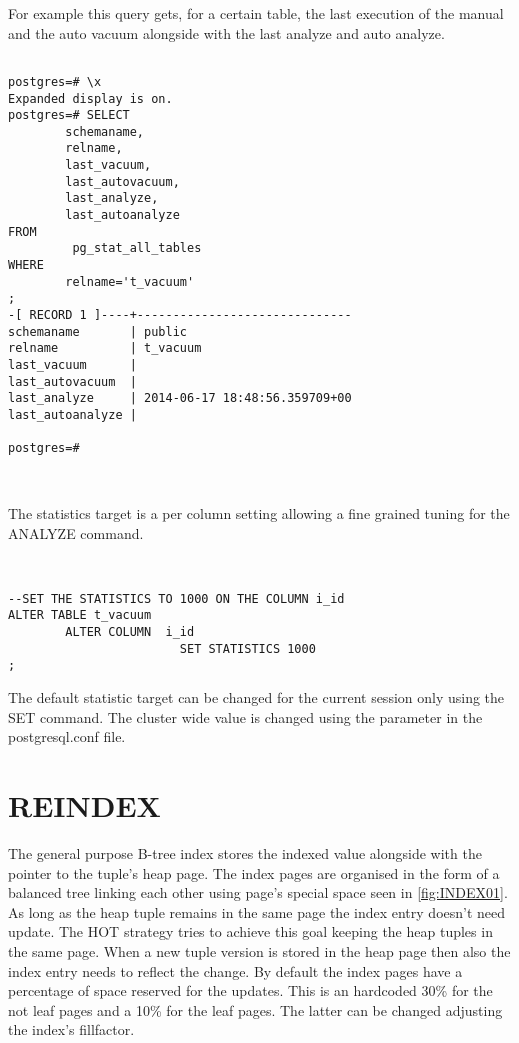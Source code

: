 For example this query gets, for a certain table,  the last execution of the manual and the auto vacuum
alongside with the last analyze and auto analyze.

\begin{lstlisting}[style=pgsql]

postgres=# \x
Expanded display is on.
postgres=# SELECT
        schemaname,
        relname,
        last_vacuum,
        last_autovacuum,
        last_analyze,
        last_autoanalyze
FROM
         pg_stat_all_tables
WHERE
        relname='t_vacuum'
;
-[ RECORD 1 ]----+------------------------------
schemaname       | public
relname          | t_vacuum
last_vacuum      |
last_autovacuum  |
last_analyze     | 2014-06-17 18:48:56.359709+00
last_autoanalyze |

postgres=#



\end{lstlisting}


The statistics target is a per column setting allowing a fine grained tuning for the ANALYZE command.

\begin{lstlisting}[style=pgsql]


--SET THE STATISTICS TO 1000 ON THE COLUMN i_id
ALTER TABLE t_vacuum
        ALTER COLUMN  i_id
                        SET STATISTICS 1000
;

\end{lstlisting}

The default statistic target can be changed for the current session only using the SET command. The cluster
wide value is changed using the parameter in the postgresql.conf file.

\section{REINDEX}\label{sec:REINDEX}
The general purpose B-tree index stores the indexed value alongside with the pointer to the
tuple's heap page. The index pages are organised in the form of a balanced tree linking each other
using page's special space seen in \ref{fig:INDEX01}. As long as the heap tuple remains in the same page
the index entry doesn't need update. The HOT strategy tries to achieve this goal keeping
the heap tuples in the same page. When a new tuple version is stored in the heap page then also the index
entry needs to reflect the change. By default the index pages have a percentage of space reserved for
the updates. This is an hardcoded 30\% for the not leaf pages and a 10\% for the leaf
pages. The latter can be changed adjusting the index's fillfactor.\newline

